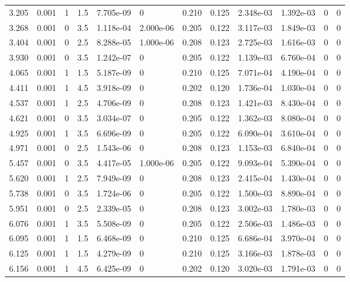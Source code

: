 \documentclass[preview]{standalone}
\begin{document}
{{\begin{tabular}{L{1.2cm}C{1.2cm} C{0.3cm}C{0.5cm} C{1.4cm}C{1.4cm} C{1.4cm}C{1.4cm} C{1.6cm}C{1.6cm} C{1.6cm}C{1.6cm}}
  3.205  &  0.001  & 1     & 1.5 &  7.705e-09  & 0  &  0.210&   0.125& 2.348e-03 & 1.392e-03   &  0 & 0  \\ 
  3.268  &  0.001  & 0     & 3.5 &  1.118e-04  & 2.000e-06  &  0.205&   0.122& 3.117e-03 & 1.849e-03   &  0 & 0  \\ 
  3.404  &  0.001  & 0     & 2.5 &  8.288e-05  & 1.000e-06  &  0.208&   0.123& 2.725e-03 & 1.616e-03   &  0 & 0  \\ 
  3.930  &  0.001  & 0     & 3.5 &  1.242e-07  & 0  &  0.205&   0.122& 1.139e-03 & 6.760e-04   &  0 & 0  \\ 
  4.065  &  0.001  & 1     & 1.5 &  5.187e-09  & 0  &  0.210&   0.125& 7.071e-04 & 4.190e-04   &  0 & 0  \\ 
  4.411  &  0.001  & 1     & 4.5 &  3.918e-09  & 0  &  0.202&   0.120& 1.736e-04 & 1.030e-04   &  0 & 0  \\ 
  4.537  &  0.001  & 1     & 2.5 &  4.706e-09  & 0  &  0.208&   0.123& 1.421e-03 & 8.430e-04   &  0 & 0  \\ 
  4.621  &  0.001  & 0     & 3.5 &  3.034e-07  & 0  &  0.205&   0.122& 1.362e-03 & 8.080e-04   &  0 & 0  \\ 
  4.925  &  0.001  & 1     & 3.5 &  6.696e-09  & 0  &  0.205&   0.122& 6.090e-04 & 3.610e-04   &  0 & 0  \\ 
  4.971  &  0.001  & 0     & 2.5 &  1.543e-06  & 0  &  0.208&   0.123& 1.153e-03 & 6.840e-04   &  0 & 0  \\ 
  5.457  &  0.001  & 0     & 3.5 &  4.417e-05  & 1.000e-06  &  0.205&   0.122& 9.093e-04 & 5.390e-04   &  0 & 0  \\ 
  5.620  &  0.001  & 1     & 2.5 &  7.949e-09  & 0  &  0.208&   0.123& 2.415e-04 & 1.430e-04   &  0 & 0  \\ 
  5.738  &  0.001  & 0     & 3.5 &  1.724e-06  & 0  &  0.205&   0.122& 1.500e-03 & 8.890e-04   &  0 & 0  \\ 
  5.951  &  0.001  & 0     & 2.5 &  2.339e-05  & 0  &  0.208&   0.123& 3.002e-03 & 1.780e-03   &  0 & 0  \\ 
  6.076  &  0.001  & 1     & 3.5 &  5.508e-09  & 0  &  0.205&   0.122& 2.506e-03 & 1.486e-03   &  0 & 0  \\ 
  6.095  &  0.001  & 1     & 1.5 &  6.468e-09  & 0  &  0.210&   0.125& 6.686e-04 & 3.970e-04   &  0 & 0  \\ 
  6.125  &  0.001  & 1     & 1.5 &  4.279e-09  & 0  &  0.210&   0.125& 3.166e-03 & 1.878e-03   &  0 & 0  \\ 
  6.156  &  0.001  & 1     & 4.5 &  6.425e-09  & 0  &  0.202&   0.120& 3.020e-03 & 1.791e-03   &  0 & 0  \\ 

\end{tabular}}}
\end{document}
